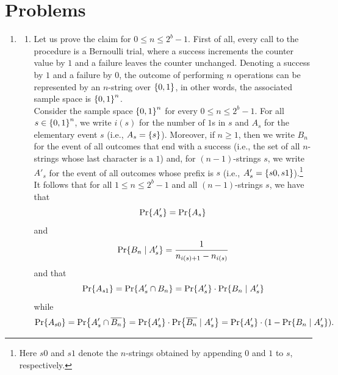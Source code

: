 \section*{Problems}
\begin{enumerate}[\thechapter-1]
%
\item
\begin{enumerate}[\it a.]
\item Let us prove the claim for $0 \leq n \leq 2^b - 1$. First of all, every call to the procedure  is a Bernoulli trial, where a success increments the counter value by $1$ and a failure leaves the counter unchanged. Denoting a success by $1$ and a failure by $0$, the outcome of performing $n$  operations can be represented by an $n$-string over $\left\{0, 1\right\}$, in other words, the associated sample space is $\left\{0, 1\right\}^{n}$.
\medskip\\
Consider the sample space $\left\{0, 1\right\}^{n}$ for every $0 \leq n \leq 2^b - 1$. For all $s \in \left\{0, 1\right\}^{n}$, we write $i(s)$ for the number of $1$s in $s$ and $A_s$ for the elementary event $s$ (i.e., $A_s = \left\{s\right\}$). Moreover, if $n \geq 1$, then we write $B_n$ for the event of all outcomes that end with a success (i.e., the set of all $n$-strings whose last character is a $1$) and, for $(n - 1)$-strings $s$, we write $A'_s$ for the event of all outcomes whose prefix is $s$ (i.e., $A'_s = \left\{s0, s1\right\}$).\footnote{Here $s0$ and $s1$ denote the $n$-strings obtained by appending $0$ and $1$ to $s$, respectively.}
\medskip\\
It follows that for all $1 \leq n \leq 2^b - 1$ and all $(n - 1)$-strings $s$, we have that
\[
\Pr\!\left\{A'_s\right\} = \Pr\!\left\{A_s\right\}
\]
and
\[
\Pr\!\left\{B_n \mid A'_s\right\} = \frac{1}{n_{i(s) + 1} - n_{i(s)}}
\]
and that
\[
\Pr\!\left\{A_{s1}\right\} = \Pr\!\left\{A'_s \cap B_n\right\} = \Pr\!\left\{A'_s\right\} \cdot \Pr\!\left\{B_n \mid A'_s\right\}
\]
while
\[
\Pr\!\left\{A_{s0}\right\} = \Pr\!\left\{A'_s \cap \overline{B_n}\right\} = \Pr\!\left\{A'_s\right\} \cdot \Pr\!\left\{\overline{B_n} \mid A'_s\right\} = \Pr\!\left\{A'_s\right\} \cdot (1 - \Pr\!\left\{B_n \mid A'_s\right\}).
\]


\end{enumerate}
\end{enumerate}
